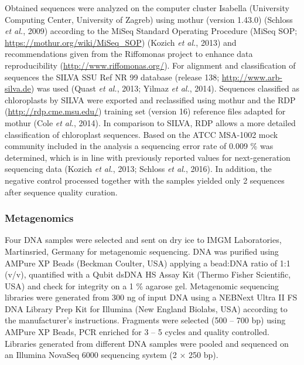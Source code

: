 \documentclass[
  12pt,
]{article}
\begin{document}
Obtained sequences were analyzed on the computer cluster Isabella
(University Computing Center, University of Zagreb) using mothur
(version 1.43.0) (Schloss \emph{et al.}, 2009) according to the MiSeq
Standard Operating Procedure (MiSeq SOP;
\url{https://mothur.org/wiki/MiSeq_SOP}) (Kozich \emph{et al.}, 2013)
and recommendations given from the Riffomonas project to enhance data
reproducibility (\url{http://www.riffomonas.org/}). For alignment and
classification of sequences the SILVA SSU Ref NR 99 database (release
138; \url{http://www.arb-silva.de}) was used (Quast \emph{et al.}, 2013;
Yilmaz \emph{et al.}, 2014). Sequences classified as chloroplasts by
SILVA were exported and reclassified using mothur and the RDP
(\url{http://rdp.cme.msu.edu/}) training set (version 16) reference
files adapted for mothur (Cole \emph{et al.}, 2014). In comparison to
SILVA, RDP allows a more detailed classification of chloroplast
sequences. Based on the ATCC MSA-1002 mock community included in the
analysis a sequencing error rate of 0.009 \si{\percent} was determined,
which is in line with previously reported values for next-generation
sequencing data (Kozich \emph{et al.}, 2013; Schloss \emph{et al.},
2016). In addition, the negative control processed together with the
samples yielded only 2 sequences after sequence quality curation.

\hypertarget{metagenomics}{%
\subsubsection{Metagenomics}\label{metagenomics}}

Four DNA samples were selected and sent on dry ice to IMGM Laboratories,
Martinsried, Germany for metagenomic sequencing. DNA was purified using
AMPure XP Beads (Beckman Coulter, USA) applying a bead:DNA ratio of 1:1
(v/v), quantified with a Qubit dsDNA HS Assay Kit (Thermo Fisher
Scientific, USA) and check for integrity on a 1 \si{\percent} agarose
gel. Metagenomic sequencing libraries were generated from 300 \si{\ng}
of input DNA using a NEBNext Ultra II FS DNA Library Prep Kit for
Illumina (New England Biolabs, USA) according to the manufacturer's
instructions. Fragments were selected (500 -- 700 bp) using AMPure XP
Beads, PCR enriched for 3 -- 5 cycles and quality controlled. Libraries
generated from different DNA samples were pooled and sequenced on an
Illumina NovaSeq 6000 sequencing system (2 × 250 bp).
\end{document}
